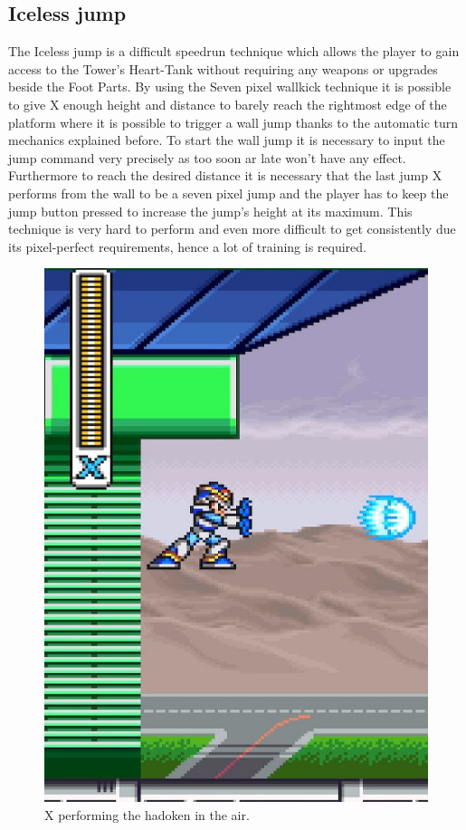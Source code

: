 \subsection{Iceless jump}\label{misc:iceless}
The Iceless jump is a difficult speedrun technique which allows the player to gain access to the Tower's Heart-Tank without requiring any weapons or upgrades beside the Foot Parts. By using the Seven pixel wallkick technique it is possible to give X enough height and distance to barely reach the rightmost edge of the platform where it is possible to trigger a wall jump thanks to the automatic turn mechanics explained before. To start the wall jump it is necessary to input the jump command very precisely as too soon ar late won't have any effect. Furthermore to reach the desired distance it is necessary that the last jump X performs from the wall to be a seven pixel jump and the player has to keep the jump button pressed to increase the jump's height at its maximum. 
This technique is very hard to perform and even more difficult to get consistently due its pixel-perfect requirements, hence a lot of training is required.

\begin{figure}[htp]
	\centering
	\includegraphics[width=0.4\linewidth]{figures/X1/Miscs/Flying_hadoken.jpg}
	\caption{X performing the hadoken in the air.}
\end{figure}
